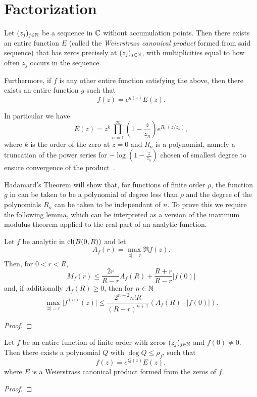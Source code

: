 \chapter{Factorization}
\label{ch:factorization}

\begin{theorem} \label{thm:weierstrass}
    Let $(z_j)_{j \in \mathbb{N}}$ be a sequence in $\mathbb{C}$ without accumulation points. Then there exists an entire function $E$ (called the \emph{Weierstrass canonical product} formed from said sequence) that has zeros precisely at $(z_j)_{j \in \mathbb{N}}$, with multiplicities equal to how often $z_j$ occurs in the sequence.

    Furthermore, if $f$ is any other entire function satisfying the above, then there exists an entire function $g$ such that
    $$ f(z) = e^{g(z)} E(z). $$
\end{theorem}

In particular we have
$$ E(z) = z^k \prod_{n=1}^\infty \left( 1 - \frac{z}{z_n} \right) e^{R_n(z / z_n)}, $$
where $k$ is the order of the zero at $z = 0$ and $R_n$ is a polynomial, namely a truncation of the power series for $-\log(1 - \frac{z}{z_n})$ chosen of smallest degree to ensure convergence of the product~\cite{segal-complex-analysis}.

Hadamard's Theorem will show that, for functions of finite order $\rho$, the function $g$ in  can be taken to be a polynomial of degree less than $\rho$ and the degree of the polynomials $R_n$ can be taken to be independant of $n$. To prove this we require the following lemma, which can be interpreted as a version of the maximum modulus theorem applied to the real part of an analytic function.

\begin{lemma} \label{lem:borel-caratheodory}
    Let $f$ be analytic in $\operatorname{cl}(B(0, R))$ and let
    $$ A_f(r) = \max_{\vert z \vert = r} \Re f(z). $$
    Then, for $0 < r < R$,
    $$ M_f(r) \leq \frac{2r}{R - r} A_f(R) + \frac{R + r}{R - r} \vert f(0) \vert $$
    and, if additionally $A_f(R) \geq 0$, then for $n \in \mathbb{N}$
    $$ \max_{\vert z \vert = r} \vert f^{(n)}(z) \vert \leq \frac{2^{n+2} n! R}{(R - r)^{n+1}} (A_f(R) + \vert f(0) \vert). $$
\end{lemma}

\begin{proof}
\end{proof}

\begin{theorem}[Hadamard] \label{thm:hadamard}
    Let $f$ be an entire function of finite order with zeros $(z_j)_{j \in \mathbb{N}}$ and $f(0) \neq 0$. Then there exists a polynomial $Q$ with $\deg Q \leq \rho_f$, such that
    $$ f(z) = e^{Q(z)} E(z), $$
    where $E$ is a Weierstrass canonical product formed from the zeros of $f$.
\end{theorem}

\begin{proof}
\end{proof}
